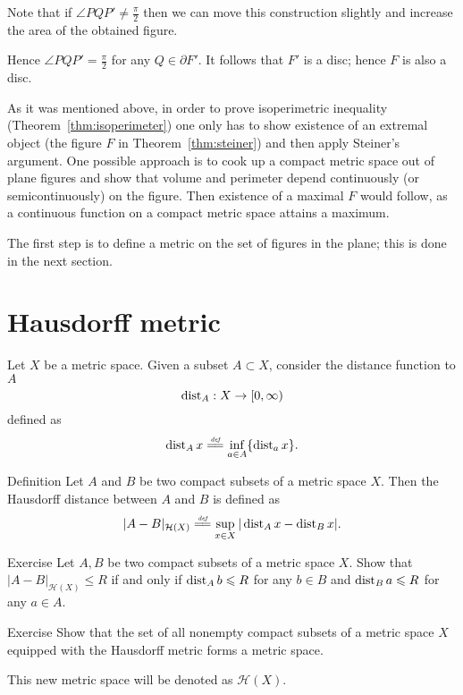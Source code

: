 Note that if $\angle PQP'\not=\tfrac\pi2$
then we can move this construction slightly and increase the area of the obtained figure.

Hence $\angle PQP'=\tfrac\pi2$ for any $Q\in \partial F'$.
It follows that $F'$ is a disc; hence $F$ is also a disc.
\qeds

As it was mentioned above, in order to prove isoperimetric inequality (Theorem~\ref{thm:isoperimeter})
one only has to show existence of an extremal object (the figure $F$ in Theorem~\ref{thm:steiner}) and then apply Steiner's argument.
One possible approach is to cook up a compact metric space out of plane figures and
show that volume and perimeter depend continuously (or semicontinuously) 
on the figure. 
Then existence of a maximal $F$ would follow, as a continuous function on a compact metric space attains a maximum.

The first step is to define a metric on the set of figures in the plane; 
this is done in the next section.


\section{Hausdorff metric}


Let $X$ be a metric space.
Given a subset $A\subset X$,
consider the distance function to $A$
$$\operatorname{dist}_A: X \to [0,\infty)$$
defined as 
$$\Dist_A x
\df
\inf_{a\in A}\{\Dist_a x\}.$$

\begin{thm}{Definition}
Let $A$ and $B$ be two compact subsets of a metric space $X$.
Then the Hausdorff distance between $A$ and $B$ is defined as 
$$|A-B|_{\mathcal{H}(X)}
\df
\sup_{x\in X}|\Dist_Ax-\Dist_Bx|.
$$

\end{thm}
 

\begin{thm}{Exercise}\label{ex:R-hausdorff}
Let $A,B$ be two compact subsets of a metric space $X$.
Show that $|A-B|_{\mathcal{H}(X)}\le R$ if and only if 
$\operatorname{dist}_Ab\leqslant R$ for any $b\in B$
and 
$\operatorname{dist}_Ba\leqslant R$ for any $a\in A$.
\end{thm}


\begin{thm}{Exercise}\label{ex:H_X}
Show that the set of all nonempty compact subsets of a metric space $X$ equipped with the Hausdorff metric forms a metric space.

This new metric space will be denoted as $\mathcal{H}(X)$.
\end{thm}

